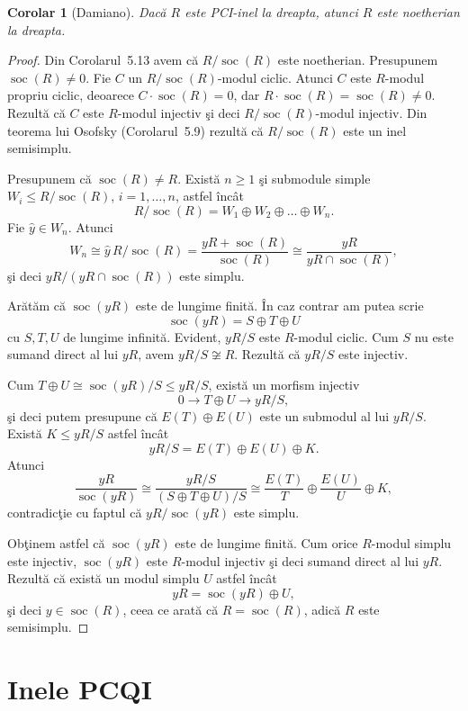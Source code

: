 \documentclass[12pt,a4paper]{book}
\DeclareMathOperator{\soc}{soc}
\theoremstyle{plain}
\newtheorem{corollary}[theorem]{Corolar}
\theoremstyle{definition}
\theoremstyle{remark}
\begin{document}
\begin{corollary}[Damiano]
Dacă \(R\) este PCI-inel la dreapta, atunci \(R\) este noetherian la dreapta.
\end{corollary}

\begin{proof}
Din Corolarul~5.13 avem că \(R/\soc(R)\) este noetherian. Presupunem
\(\soc(R) \neq 0\).
Fie \(C\) un \(R/\soc(R)\)-modul ciclic. Atunci \(C\) este \(R\)-modul propriu
ciclic, deoarece \(C \cdot \soc(R) = 0\), dar \(R \cdot \soc(R) = \soc(R) \neq 0\).
Rezultă că \(C\) este \(R\)-modul injectiv şi deci \(R/\soc(R)\)-modul injectiv.
Din teorema lui Osofsky (Corolarul~5.9) rezultă că \(R/\soc(R)\) este un inel
semisimplu.

Presupunem că \(\soc(R) \neq R\). Există \(n \geq 1\) şi submodule simple
\(W_i \leq R/\soc(R)\), \(i = 1,\dots,n\), astfel încât
\[
  R/\soc(R) = W_1 \oplus W_2 \oplus \dots \oplus W_n.
\]
Fie \(\widehat{y} \in W_n\). Atunci
\[
  W_n \cong \widehat{y}\,R/\soc(R)
         = \frac{yR + \soc(R)}{\soc(R)}
         \cong \frac{yR}{yR \cap \soc(R)},
\]
şi deci \(yR/(yR \cap \soc(R))\) este simplu.

Arătăm că \(\soc(yR)\) este de lungime finită. În caz contrar am putea scrie
\[
  \soc(yR) = S \oplus T \oplus U
\]
cu \(S,T,U\) de lungime infinită. Evident, \(yR/S\) este \(R\)-modul ciclic.
Cum \(S\) nu este sumand direct al lui \(yR\), avem \(yR/S \not\cong R\).
Rezultă că \(yR/S\) este injectiv.

Cum \(T \oplus U \cong \soc(yR)/S \leq yR/S\), există un morfism injectiv
\[
  0 \longrightarrow T \oplus U \longrightarrow yR/S,
\]
şi deci putem presupune că \(E(T) \oplus E(U)\) este un submodul al lui \(yR/S\).
Există \(K \leq yR/S\) astfel încât
\[
  yR/S = E(T) \oplus E(U) \oplus K.
\]
Atunci
\[
  \frac{yR}{\soc(yR)}
    \cong \frac{yR/S}{(S \oplus T \oplus U)/S}
    \cong \frac{E(T)}{T} \oplus \frac{E(U)}{U} \oplus K,
\]
contradicţie cu faptul că \(yR/\soc(yR)\) este simplu.

Obţinem astfel că \(\soc(yR)\) este de lungime finită.
Cum orice \(R\)-modul simplu este injectiv, \(\soc(yR)\) este \(R\)-modul injectiv
şi deci sumand direct al lui \(yR\).
Rezultă că există un modul simplu \(U\) astfel încât
\[
  yR = \soc(yR) \oplus U,
\]
şi deci \(y \in \soc(R)\), ceea ce arată că \(R = \soc(R)\), adică \(R\) este
semisimplu.
\end{proof}


\chapter{Inele PCQI}
\end{document}

